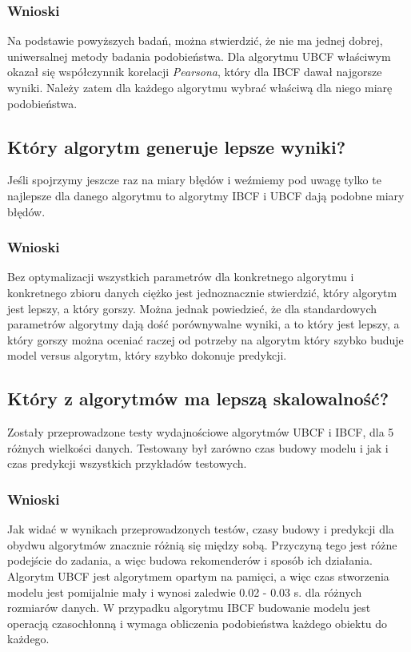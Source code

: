 \documentclass[12pt, a4paper]{article}
\begin{document}


\subsubsection{Wnioski}
Na podstawie powyższych badań, można stwierdzić, że nie ma jednej dobrej, uniwersalnej metody badania podobieństwa. Dla algorytmu UBCF właściwym okazał się współczynnik korelacji \emph{Pearsona}, który dla IBCF dawał najgorsze wyniki. Należy zatem dla każdego algorytmu wybrać właściwą dla niego miarę podobieństwa.

\subsection{Który algorytm generuje lepsze wyniki?}
Jeśli spojrzymy jeszcze raz na miary błędów i weźmiemy pod uwagę tylko te najlepsze dla danego algorytmu to  algorytmy IBCF i UBCF dają podobne miary błędów.





\subsubsection{Wnioski}
Bez optymalizacji wszystkich parametrów dla konkretnego algorytmu i konkretnego zbioru danych ciężko jest jednoznacznie stwierdzić, który algorytm jest lepszy, a który gorszy. Można jednak powiedzieć, że dla standardowych parametrów algorytmy dają dość porównywalne wyniki, a to który jest lepszy, a który gorszy można oceniać raczej od potrzeby na algorytm który szybko buduje model versus algorytm, który szybko dokonuje predykcji.

\subsection{Który z algorytmów ma lepszą skalowalność?}
\label{skalowalnosc-pytanie}
Zostały przeprowadzone testy wydajnościowe algorytmów UBCF i IBCF, dla 5 różnych wielkości danych. Testowany był zarówno czas budowy modelu i jak i czas predykcji wszystkich przykładów testowych.



\subsubsection{Wnioski}
Jak widać w wynikach przeprowadzonych testów, czasy budowy i predykcji dla obydwu algorytmów znacznie różnią się między sobą. 
Przyczyną tego jest różne podejście do zadania, a więc budowa rekomenderów i sposób ich działania.
Algorytm UBCF jest algorytmem opartym na pamięci, a więc czas stworzenia modelu jest pomijalnie mały i wynosi zaledwie 0.02 - 0.03 s. dla różnych rozmiarów danych. 
W przypadku algorytmu IBCF budowanie modelu jest operacją czasochłonną i wymaga obliczenia podobieństwa każdego obiektu do każdego.\
\end{document}
